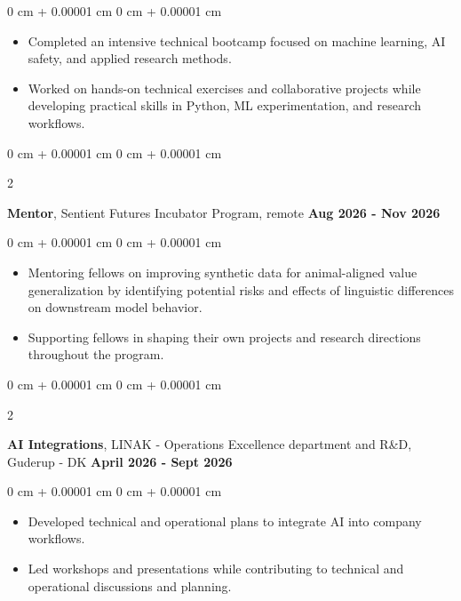 \documentclass[10pt, letterpaper]{article}
\newenvironment{highlights}{
    \begin{itemize}[
        topsep=0.10 cm,
        parsep=0.10 cm,
        partopsep=0pt,
        itemsep=0pt,
        leftmargin=0 cm + 10pt
    ]
}{
    \end{itemize}
} %
\newenvironment{onecolentry}{
    \begin{adjustwidth}{
        0 cm + 0.00001 cm
    }{
        0 cm + 0.00001 cm
    }
}{
    \end{adjustwidth}
} %
\newenvironment{twocolentry}[2][]{
    \onecolentry
    \def\secondColumn{#2}
    \setcolumnwidth{\fill, 4.5 cm}
    \begin{paracol}{2}
}{
    \switchcolumn \raggedleft \secondColumn
    \end{paracol}
    \endonecolentry
} %
\begin{document}
        \vspace{0.1 cm}
        
        \begin{onecolentry}
            \begin{highlights}
                \item Completed an intensive technical bootcamp focused on machine learning, AI safety, and applied research methods. 
                \item Worked on hands-on technical exercises and collaborative projects while developing practical skills in Python, ML experimentation, and research workflows.
            \end{highlights}
        \end{onecolentry}

        \begin{twocolentry}{
        \textbf{Aug 2026 - Nov 2026}
        }
            \textbf{Mentor}, Sentient Futures Incubator Program, remote\end{twocolentry}

        \vspace{0.1 cm}
        
        \begin{onecolentry}
            \begin{highlights}
                \item Mentoring fellows on improving synthetic data for animal-aligned value generalization by identifying potential risks and effects of linguistic differences on downstream model behavior.
                \item Supporting fellows in shaping their own projects and research directions throughout the program.
            \end{highlights}
        \end{onecolentry}

        \vspace{0.2 cm}
    
        \begin{twocolentry}{
        \textbf{April 2026 - Sept 2026}
        }
            \textbf{AI Integrations}, LINAK - Operations Excellence department and R\&D, Guderup - DK\end{twocolentry}

        \vspace{0.1 cm}
        
        \begin{onecolentry}
            \begin{highlights}
                \item Developed technical and operational plans to integrate AI into company workflows.
                \item Led workshops and presentations while contributing to technical and operational discussions and planning.
            \end{highlights}
        \end{onecolentry}
\end{document}
